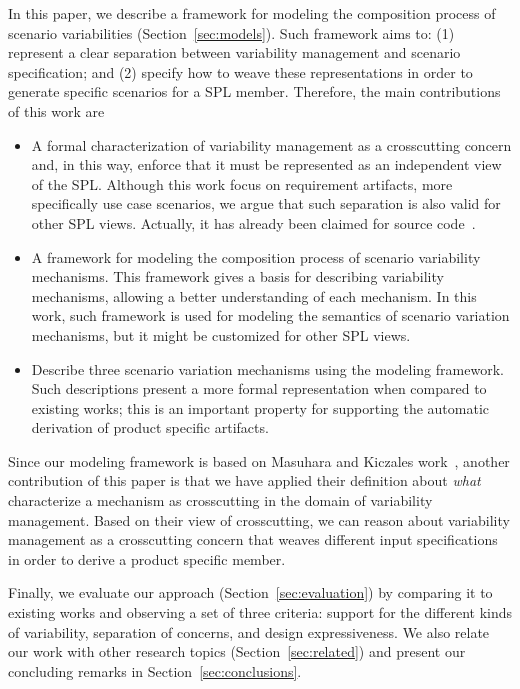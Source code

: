 \documentclass{acm_proc_article-sp}
\begin{document}
In this paper, we describe a framework for modeling the composition 
process of scenario variabilities (Section~\ref{sec:models}). 
Such framework aims to: (1) represent a clear separation between variability management 
and scenario specification; and (2) specify how to weave these representations in order to generate
specific scenarios for a SPL member. Therefore, the main contributions of this work are

\begin{itemize}

\item A formal characterization of variability management as a crosscutting concern and, in this way, enforce that it  
must be represented as an independent view of the SPL. Although this work focus on requirement artifacts, 
more specifically use case scenarios, we argue that such separation is also valid for other SPL views. Actually,
it has already been claimed for source code~\cite{alves-gpce-06,mmedeiros-lawasp-2007}.
  
\item A framework for modeling the composition process of scenario variability mechanisms. 
This framework gives a basis for describing variability mechanisms, 
allowing a better understanding of each mechanism. In this work, such framework is used for modeling 
the semantics of scenario variation mechanisms, but it might be customized for other SPL views.

\item Describe three scenario variation mechanisms using the
modeling framework. Such descriptions present
a more formal representation when compared to existing works; this is an
important property for supporting the automatic derivation of product
specific artifacts.

\end{itemize}

Since our modeling framework is based on Masuhara and Kiczales work~\cite{kiczales-ecoop-2003}, another 
contribution of this paper is that we have applied their definition about \emph{what} characterize a mechanism as crosscutting in the domain of variability management. Based on their view of crosscutting, we can reason about variability management as a crosscutting concern that weaves different input specifications in order to derive a product specific member. 

Finally, we evaluate our approach (Section~\ref{sec:evaluation}) by comparing it 
to existing works and observing a set of three criteria: support for the 
different kinds of variability, separation of concerns, and design expressiveness.  We 
also relate our work with other research topics (Section~\ref{sec:related}) and present our concluding 
remarks in Section~\ref{sec:conclusions}.
\end{document}
